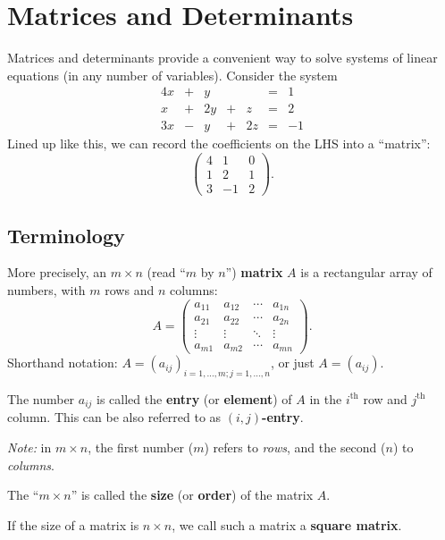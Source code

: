 \documentclass[
  english,
  12pt,
  oneside]{book}
\theoremstyle{definition}
\theoremstyle{definition}
\theoremstyle{definition}
\theoremstyle{definition}
\theoremstyle{remark}
\begin{document}
\chapter{Matrices and Determinants}\label{matrices-and-determinants}

Matrices and determinants provide a convenient way to solve systems of linear
equations (in any number of variables). Consider the system
\[\begin{matrix}
    4x & + & y  &   &    & = & 1\\
    x  & + & 2y & + & z  & = & 2\\
    3x & - & y  & + & 2z & = & -1
\end{matrix}\]
Lined up like this, we can record the coefficients on the LHS into a ``matrix'':
\[\begin{pmatrix}
    4 & 1 & 0\\ 1 & 2 & 1 \\ 3 & -1 & 2
\end{pmatrix}.\]

\section{Terminology}\label{terminology}

More precisely, an \(m\times n\) (read ``\(m\) by \(n\)'') \textbf{matrix} \(A\) is a rectangular array of numbers, with \(m\) rows and \(n\) columns:
\[A = \begin{pmatrix}
    a_{11} & a_{12} & \cdots & a_{1n}\\
    a_{21} & a_{22} & \cdots & a_{2n}\\
    \vdots & \vdots & \ddots & \vdots \\
    a_{m1} & a_{m2} & \cdots & a_{mn}
\end{pmatrix}.\]
Shorthand notation: \(A=(a_{ij})_{i=1,\dots,m; j=1,\dots,n}\), or just \(A=(a_{ij})\).

The number \(a_{ij}\) is called the \textbf{entry} (or \textbf{element}) of \(A\) in the \(i^\text{th}\) row and \(j^\text{th}\) column. This can be also referred to as \textbf{\((i,j)\)-entry}.

\emph{Note:} in \(m\times n\), the first number (\(m\)) refers to \emph{rows}, and the second (\(n\)) to \emph{columns}.

The ``\(m \times n\)'' is called the \textbf{size} (or \textbf{order}) of the matrix \(A\).

If the size of a matrix is \(n\times n\), we call such a matrix a \textbf{square matrix}.
\end{document}
